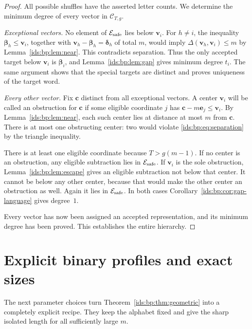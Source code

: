 \documentclass[11pt,letterpaper]{article}
\theoremstyle{definition}\newtheorem{definition}[theorem]{Definition}
\theoremstyle{remark}\newtheorem{remark}[theorem]{Remark}
\theoremstyle{definition}\newtheorem{question}[theorem]{Question}
\newcommand{\bpC}[2]{\mathcal C_{#1,#2}}
\newcommand{\bpE}{\mathcal E}
\begin{document}
\begin{proof}
All possible shuffles have the asserted letter counts. We determine the
minimum degree of every vector in $\bpC{T}{g}$.

\emph{Exceptional vectors.} No element of $\bpE_{\rm safe}$ lies below
$\mathbf v_i$. For $h\ne i$, the inequality
$\boldsymbol\beta_h\leq\mathbf v_i$, together with
$\mathbf v_h-\boldsymbol\beta_h=\boldsymbol\delta_h$ of total $m$,
would imply $\Delta(\mathbf v_h,\mathbf v_i)\leq m$ by
Lemma~\ref{ids:bp:lem:near}. This contradicts separation. Thus the only
accepted target below $\mathbf v_i$ is $\boldsymbol\beta_i$, and
Lemma~\ref{ids:bp:lem:gap} gives minimum degree $t_i$. The same argument shows
that the special targets are distinct and proves uniqueness of the target
word.

\emph{Every other vector.} Fix $\mathbf c$ distinct from all exceptional
vectors. A center $\mathbf v_i$ will be called an obstruction for $\mathbf c$
if some eligible coordinate $j$ has
$\mathbf c-m\mathbf e_j\leq\mathbf v_i$. By Lemma~\ref{ids:bp:lem:near}, each
such center lies at distance at most $m$ from $\mathbf c$. There is at most
one obstructing center: two would violate \eqref{ids:bp:eq:separation} by the
triangle inequality.

There is at least one eligible coordinate because $T>g(m-1)$. If no center
is an obstruction, any eligible subtraction lies in $\bpE_{\rm safe}$. If
$\mathbf v_i$ is the sole obstruction, Lemma~\ref{ids:bp:lem:escape} gives an
eligible subtraction not below that center. It cannot be below any other
center, because that would make the other center an obstruction as well.
Again it lies in $\bpE_{\rm safe}$. In both cases
Corollary~\ref{ids:bp:cor:gap-language} gives degree~$1$.

Every vector has now been assigned an accepted representation, and its
minimum degree has been proved. This establishes the entire hierarchy.
\end{proof}

\section{Explicit binary profiles and exact sizes}
\label{ids:bp:sec:construction}

The next parameter choices turn Theorem~\ref{ids:bp:thm:geometric} into a
completely explicit recipe. They keep the alphabet fixed and give the sharp
isolated length for all sufficiently large $m$.
\end{document}
